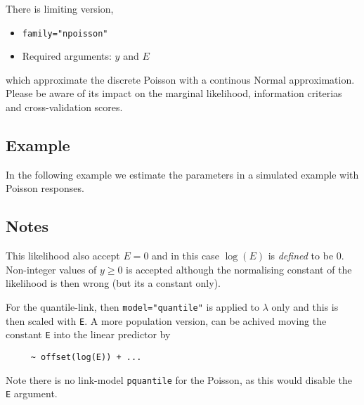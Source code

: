 \documentclass[a4paper,11pt]{article}
\begin{document}
\noindent There is limiting version,
\begin{itemize}
\item \texttt{family="npoisson"}
\item Required arguments: $y$ and $E$
\end{itemize}
which approximate the discrete Poisson with a continous Normal
approximation. Please be aware of its impact on the marginal
likelihood, information criterias and cross-validation scores.

\subsection*{Example}

In the following example we estimate the parameters in a simulated
example with Poisson responses.


\subsection*{Notes}

This likelihood also accept $E=0$ and in this case $\log(E)$ is
\emph{defined} to be $0$. Non-integer values of $y \ge 0$ is accepted
although the normalising constant of the likelihood is then wrong (but
its a constant only).

For the quantile-link, then \texttt{model="quantile"} is applied to
$\lambda$ only and this is then scaled with \texttt{E}. A more
population version, can be achived moving the constant \texttt{E} into
the linear predictor by 
\begin{verbatim}
     ~ offset(log(E)) + ...
\end{verbatim}
Note there is no link-model \texttt{pquantile} for the Poisson, as
this would disable the \texttt{E} argument.
\end{document}

